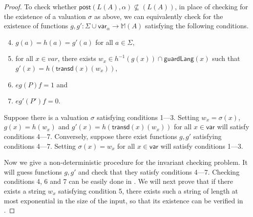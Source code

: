 \documentclass[12pt, a4paper]{article}
\newcommand{\var}{\textsf{var}}
\newcommand{\T}{\textsf{transd}}
\newcommand{\post}{\textsf{post}}
\newcommand{\ssub}{\sigma} %
\newcommand{\guardL}{\textsf{guardLang}}
\newcommand{\alphabet}{\Sigma}
\renewcommand{\aut}{A}
\newcommand{\Aut}{\aut}
\newcommand{\matrixSet}{\mathbb M}
\begin{document}
\begin{proof}
	To check whether $\post(L(\Aut),\alpha) \not\subseteq (L(\Aut))$, in place of checking for the existence of a valuation $\ssub$ as
	above, we can equivalently check for the existence of functions $g,g' : \alphabet \cup \var_\alpha \to \matrixSet(\Aut)$ satisfying
	the following conditions.
	\begin{enumerate}
		\setcounter{enumi}{3}
		\item $g(a) = h(a) = g'(a)$ for all $a \in \Sigma$,
		\item for all $x \in var$, there exists $w_x \in h^{-1}(g(x)) \cap \guardL(x)$ such that $g'(x) = h(\T(x)(w_x))$,
		\item $e g(P) f = 1$ and
		\item $e g'(P') f = 0$.
	\end{enumerate}

	Suppose there is a valuation $\sigma$ satisfying conditions 1---3. Setting $w_x=\sigma(x)$, $g(x)=h(w_x)$ and $g'(x)=h(\T(x)(w_x))$ for
	all $x\in \var$ will satisfy conditions 4---7. Conversely, suppose there exist functions $g,g'$ satisfying conditions 4---7. Setting
	$\sigma(x)=w_x$ for all $x \in \var$ will satisfy conditions 1---3.

	Now we give a non-deterministic \psp{} procedure for the invariant checking problem. It will guess functions $g,g'$ and check that they
	satisfy conditions 4---7. Checking conditions 4, 6 and 7 can be easily done in \psp{}. We will next prove that if there exists a string
	$w_x$ satisfying condition 5, there exists such a string of length at most exponential in the size of the input, so that its existence can
	be verified in \psp{}.


\end{proof}
\end{document}
